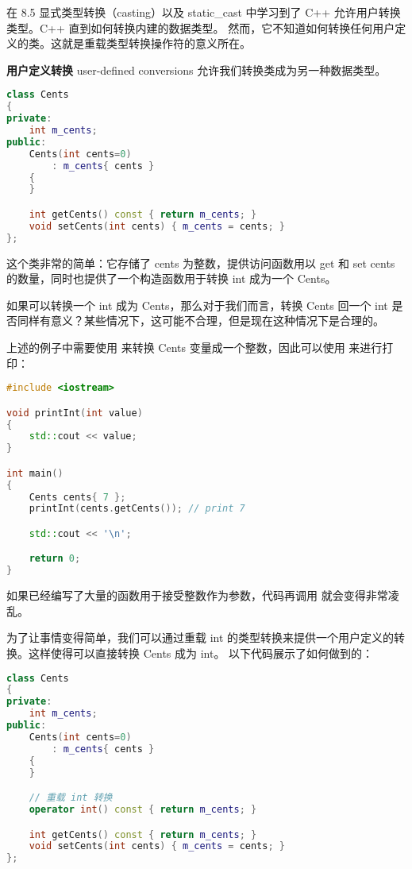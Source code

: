 \documentclass[../../LearnCpp.tex]{subfiles}
\begin{document}

在 8.5 显式类型转换（casting）以及 static\_cast 中学习到了 C++ 允许用户转换类型。C++ 直到如何转换内建的数据类型。
然而，它不知道如何转换任何用户定义的类。这就是重载类型转换操作符的意义所在。

\textbf{用户定义转换} user-defined conversions 允许我们转换类成为另一种数据类型。

\begin{lstlisting}[language=C++]
class Cents
{
private:
    int m_cents;
public:
    Cents(int cents=0)
        : m_cents{ cents }
    {
    }

    int getCents() const { return m_cents; }
    void setCents(int cents) { m_cents = cents; }
};
\end{lstlisting}

这个类非常的简单：它存储了 cents 为整数，提供访问函数用以 get 和 set cents 的数量，同时也提供了一个构造函数用于转换 int 成为一个 Cents。

如果可以转换一个 int 成为 Cents，那么对于我们而言，转换 Cents 回一个 int 是否同样有意义？某些情况下，这可能不合理，但是现在这种情况下是合理的。

上述的例子中需要使用  来转换 Cents 变量成一个整数，因此可以使用  来进行打印：

\begin{lstlisting}[language=C++]
#include <iostream>

void printInt(int value)
{
    std::cout << value;
}

int main()
{
    Cents cents{ 7 };
    printInt(cents.getCents()); // print 7

    std::cout << '\n';

    return 0;
}
\end{lstlisting}

如果已经编写了大量的函数用于接受整数作为参数，代码再调用  就会变得非常凌乱。

为了让事情变得简单，我们可以通过重载 int 的类型转换来提供一个用户定义的转换。这样使得可以直接转换 Cents 成为 int。
以下代码展示了如何做到的：

\begin{lstlisting}[language=C++]
class Cents
{
private:
    int m_cents;
public:
    Cents(int cents=0)
        : m_cents{ cents }
    {
    }

    // 重载 int 转换
    operator int() const { return m_cents; }

    int getCents() const { return m_cents; }
    void setCents(int cents) { m_cents = cents; }
};
\end{lstlisting}
\end{document}
